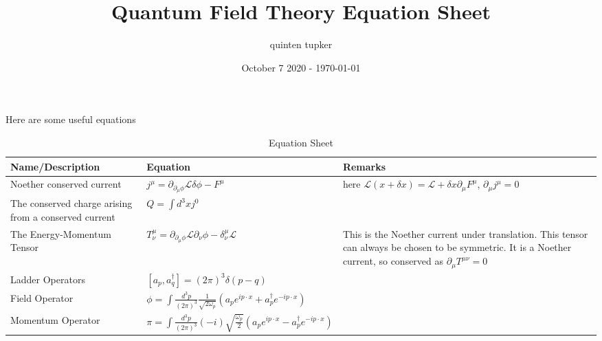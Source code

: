 \documentclass{article}
\title{Quantum Field Theory Equation Sheet}
\author{quinten tupker}
\date{October 7 2020 - \today}
\theoremstyle{definition}
\begin{document}
\maketitle

Here are some useful equations

\begin{table}[H]
  \caption{Equation Sheet}
  \begin{adjustbox}{center}
    \begin{tabular}{|p{5cm}|p{10cm}|p{5cm}|}
      \hline
      \label{equations_1}
      Name/Description & Equation & Remarks \\ \hline
      Noether conserved current & $j^\mu = \partial_{\partial_\mu \phi} \mathcal{L} \delta \phi - F^\mu$ & here $\mathcal{L}(x + \delta x) = \mathcal{L} + \delta x \partial_\mu F^\mu$, $\partial_\mu j^\mu = 0$ \\ \hline
      The conserved charge arising from a conserved current & $Q = \int d^3x j^0$ & \\ \hline
      The Energy-Momentum Tensor & $T^\mu_\nu = \partial_{\partial_\mu \phi} \mathcal{L} \partial_\nu \phi - \delta^\mu_\nu \mathcal{L}$ & This is the Noether current under translation. This tensor can always be chosen to be symmetric. It is a Noether current, so conserved as $\partial_\mu T^{\mu \nu} = 0$ \\ \hline
      Ladder Operators & $[a_p, a_q^\dagger] = (2\pi)^3 \delta(p - q)$ & \\ \hline
      Field Operator & $\phi = \int \frac{d^3p}{(2\pi)^3} \frac{1}{\sqrt{2\omega_p}} (a_p e^{i p \cdot x} + a_p^\dagger e^{-i p \cdot x})$ & \\ \hline
      Momentum Operator & $\pi = \int \frac{d^3p}{(2\pi)^3} (-i) \sqrt{\frac{\omega_p}{2}} (a_p e^{i p \cdot x} - a_p^\dagger e^{-ip \cdot x})$ & \\ \hline
    \end{tabular}
  \end{adjustbox}
\end{table}
\end{document}
